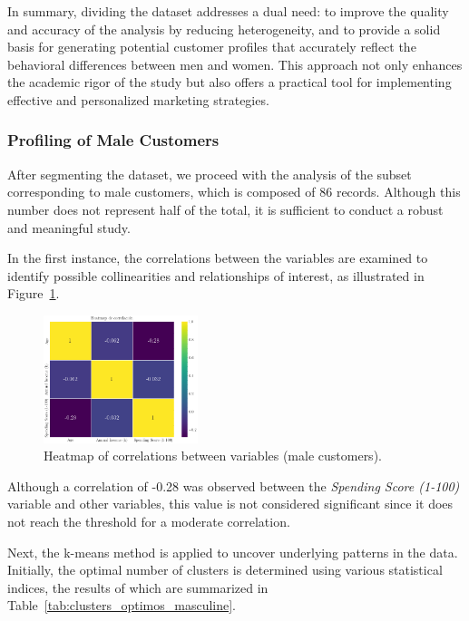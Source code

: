 \documentclass[10pt]{article}
\begin{document}
In summary, dividing the dataset addresses a dual need: to improve the quality and accuracy of the analysis by reducing heterogeneity, and to provide a solid basis for generating potential customer profiles that accurately reflect the behavioral differences between men and women. This approach not only enhances the academic rigor of the study but also offers a practical tool for implementing effective and personalized marketing strategies.



\subsubsection{Profiling of Male Customers}

After segmenting the dataset, we proceed with the analysis of the subset corresponding to male customers, which is composed of 86 records. Although this number does not represent half of the total, it is sufficient to conduct a robust and meaningful study.

In the first instance, the correlations between the variables are examined to identify possible collinearities and relationships of interest, as illustrated in Figure~\ref{fig:miGrafico11}.

\begin{figure}[h]
    \centering
    \includegraphics[width=0.4\textwidth]{plots_investing/Grafico 11.png}
    \caption{Heatmap of correlations between variables (male customers).}
    \label{fig:miGrafico11}
\end{figure}

Although a correlation of -0.28 was observed between the \textit{Spending Score (1-100)} variable and other variables, this value is not considered significant since it does not reach the threshold for a moderate correlation.

Next, the k-means method is applied to uncover underlying patterns in the data. Initially, the optimal number of clusters is determined using various statistical indices, the results of which are summarized in Table~\ref{tab:clusters_optimos_masculine}.
\end{document}

